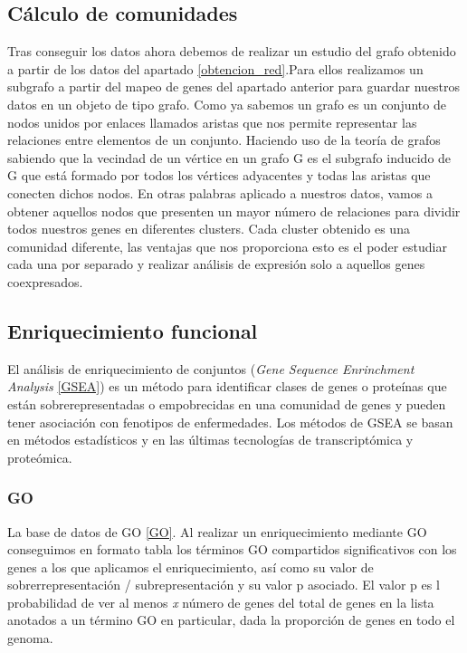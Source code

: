 \subsection{Cálculo de comunidades}

Tras conseguir los datos ahora debemos de realizar un estudio del grafo obtenido a partir de los datos del apartado \ref{obtencion_red}.Para ellos realizamos un subgrafo a partir del mapeo de genes del apartado anterior para guardar nuestros datos en un objeto de tipo grafo. Como ya sabemos un grafo es un conjunto de nodos unidos por enlaces llamados aristas que nos permite representar las relaciones entre elementos de un conjunto. Haciendo uso de la teoría de grafos sabiendo que la vecindad de un vértice en un grafo G es el subgrafo inducido de G que está formado por todos los vértices adyacentes y todas las aristas que conecten dichos nodos. En otras palabras aplicado a nuestros datos, vamos a obtener aquellos nodos que presenten un mayor número de relaciones para dividir todos nuestros genes en diferentes clusters. Cada cluster obtenido es una comunidad diferente, las ventajas que nos proporciona esto es el poder estudiar cada una por separado y realizar análisis de expresión solo a aquellos genes coexpresados. \cite{} \cite{}

\subsection{Enriquecimiento funcional}

El análisis de enriquecimiento de conjuntos (\textit{Gene Sequence Enrinchment Analysis} \ref{GSEA}) es un método para identificar clases de genes o proteínas que están sobrerepresentadas o empobrecidas en una comunidad de genes y pueden tener asociación con fenotipos de enfermedades. Los métodos de GSEA se basan en métodos estadísticos y en las últimas tecnologías de transcriptómica y proteómica.

\subsubsection{GO}
La base de datos de GO \ref{GO}. Al realizar un enriquecimiento mediante GO conseguimos en formato tabla los términos GO compartidos significativos con los genes a los que aplicamos el enriquecimiento, así como su valor de sobrerrepresentación / subrepresentación y su valor p asociado. El valor p es l probabilidad de ver al menos \textit{x} número de genes del total de genes en la lista anotados a un término GO en particular, dada la proporción de genes en todo el genoma. \\

